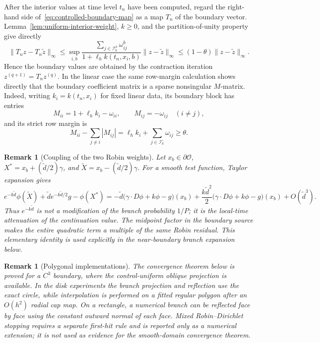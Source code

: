 \documentclass[10pt,a4paper]{amsart}
\newtheorem{remark}[theorem]{Remark}
\newcommand{\cO}{\mathcal{O}}
\begin{document}
	After the interior values at time level $t_n$ have been computed, regard the
	right-hand side of~\eqref{eq:controlled-boundary-map} as a map $T_n$ of the
	boundary vector.  Lemma~\ref{lem:uniform-interior-weight}, $k\ge0$, and the
	partition-of-unity property give directly
	\[
	\|T_nz-T_n\widetilde z\|_\infty
	\le\sup_{i,b}
	\frac{\sum_{j\in\mathcal I_h^\partial}\omega_{ij}^b}
	{1+\ell_hk(t_n,x_i,b)}
	\|z-\widetilde z\|_\infty
	\le(1-\theta)\|z-\widetilde z\|_\infty.
	\]
	Hence the boundary values are obtained by the contraction iteration
	$z^{(q+1)}=T_nz^{(q)}$.  In the linear case the same row-margin calculation
	shows directly that the boundary coefficient matrix is a sparse nonsingular
	$M$-matrix.  Indeed, writing $k_i=k(t_n,x_i)$ for fixed linear data, its
	boundary block has entries
	\[
	M_{ii}=1+\ell_h k_i-\omega_{ii},\qquad
	M_{ij}=-\omega_{ij}\quad(i\ne j),
	\]
	and its strict row margin is
	\[
	M_{ii}-\sum_{j\ne i}|M_{ij}|
	=\ell_h k_i+\sum_{j\in\mathcal I_h^\circ}\omega_{ij}
	\ge\theta.
	\]
	\begin{remark}[Coupling of the two Robin weights]\label{rem:coupled-weights}
		Let $x_b\in\partial\cO$,
		$X^*=x_b+(\widetilde d/2)\gamma$, and
		$\widetilde X=x_b-(\widetilde d/2)\gamma$.  For a smooth test function,
		Taylor expansion gives
		\[
		e^{-k\widetilde d}\phi(\widetilde X)
		+\widetilde d e^{-k\widetilde d/2}g-\phi(X^*)
		=-\widetilde d\bigl(\gamma\cdot D\phi+k\phi-g\bigr)(x_b)
		+\frac{k\widetilde d^2}{2}
		\bigl(\gamma\cdot D\phi+k\phi-g\bigr)(x_b)
		+O(\widetilde d^3).
		\]
		Thus $e^{-k\widetilde d}$ is not a modification of the branch probability $1/P$; it is
		the local-time attenuation of the continuation value.  The midpoint factor in
		the boundary source makes the entire quadratic term a multiple of the same
		Robin residual.  This elementary identity is used explicitly in the
		near-boundary branch expansion below.
	\end{remark}
	
	\begin{remark}[Polygonal implementations]
		The convergence theorem below is proved for a $C^3$ boundary, where the control-uniform oblique projection is available.  In the disk experiments the branch projection and reflection use the exact circle, while interpolation is performed on a fitted regular polygon after an $O(h^2)$ radial cap map.  On a rectangle, a numerical branch can be reflected face by face using the constant outward normal of each face.  Mixed Robin--Dirichlet stopping requires a separate first-hit rule and is reported only as a numerical extension; it is not used as evidence for the smooth-domain convergence theorem.
	\end{remark}
	
\end{document}
